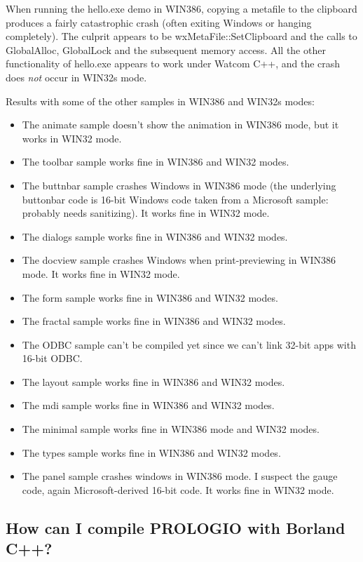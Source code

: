 When running the hello.exe demo in WIN386, copying a metafile to the clipboard
produces a fairly catastrophic crash (often exiting Windows or
hanging completely). The culprit appears to be wxMetaFile::SetClipboard
and the calls to GlobalAlloc, GlobalLock and the subsequent memory access.
All the other functionality of hello.exe appears to work under Watcom C++,
and the crash does {\it not} occur in WIN32s mode.

Results with some of the other samples in WIN386 and WIN32s modes:

\begin{itemize}\itemsep=0pt
\item The animate sample doesn't show the animation in WIN386 mode,
but it works in WIN32 mode.
\item The toolbar sample works fine in WIN386 and WIN32 modes.
\item The buttnbar sample crashes Windows in WIN386 mode (the underlying buttonbar
code is 16-bit Windows code taken from a Microsoft sample: probably
needs sanitizing). It works fine in WIN32 mode.
\item The dialogs sample works fine in WIN386 and WIN32 modes.
\item The docview sample crashes Windows when print-previewing in WIN386 mode.
It works fine in WIN32 mode.
\item The form sample works fine in WIN386 and WIN32 modes.
\item The fractal sample works fine in WIN386 and WIN32 modes.
\item The ODBC sample can't be compiled yet since we can't link 32-bit
apps with 16-bit ODBC.
\item The layout sample works fine in WIN386 and WIN32 modes.
\item The mdi sample works fine in WIN386 and WIN32 modes.
\item The minimal sample works fine in WIN386 mode and WIN32 modes.
\item The types sample works fine in WIN386 and WIN32 modes.
\item The panel sample crashes windows in WIN386 mode. I suspect the gauge code, again
Microsoft-derived 16-bit code. It works fine in WIN32 mode.
\end{itemize}

\subsection{How can I compile PROLOGIO with Borland C++?}

